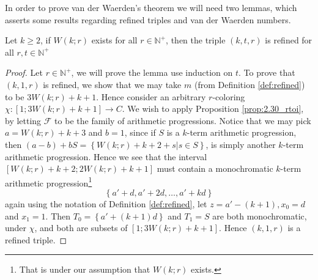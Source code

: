 In order to prove van der Waerden's theorem we will need two lemmas, which asserts some results regarding refined triples and van der Waerden numbers.
\begin{lemma}\label{lem:2.35_rtoi}
	Let $k \geq 2$, if $W(k; r)$ exists for all $r \in \mathbb{N}^{+}$, then the triple $(k, t, r)$ is refined for all $r, t \in \mathbb{N}^{+}$
\end{lemma}
\begin{proof}
	Let $r \in \mathbb{N}^{+}$, we will prove the lemma use induction on $t$. To prove that $(k, 1, r)$ is refined, we show that we may take $m$ (from Definition \ref{def:refined}) to be $3W(k; r) + k + 1$. Hence consider an arbitrary $r$-coloring $\chi: [1; 3W(k;r) + k + 1] \to C$. We wish to apply Proposition \ref{prop:2.30_rtoi}, by letting $\mathcal{F}$ to be the family of arithmetic progressions. Notice that we may pick $a = W(k;r) + k + 3$ and $b = 1$, since if $S$ is a $k$-term arithmetic progression, then $(a - b) + bS = \left\{W(k; r) + k + 2 + s | s \in S\right\}$, is simply another $k$-term arithmetic progression. Hence we see that the interval $[W(k;r) + k + 2; 2W(k; r) + k + 1]$ must contain a monochromatic $k$-term arithmetic progression\footnote{That is under our assumption that $W(k;r)$ exists.}
	\begin{equation*}
		\left\{a' + d, a' + 2d, \ldots, a' + kd\right\}
	\end{equation*}
	again using the notation of Definition \ref{def:refined}, let $z = a' - (k + 1), x_0 = d$ and $x_1 = 1$. Then $T_{0} = \left\{a' + (k + 1)d\right\}$ and $T_1 = S$ are both monochromatic, under $\chi$, and both are subsets of $[1; 3W(k; r) + k + 1]$. Hence $(k, 1, r)$ is a refined triple.


\end{proof}
